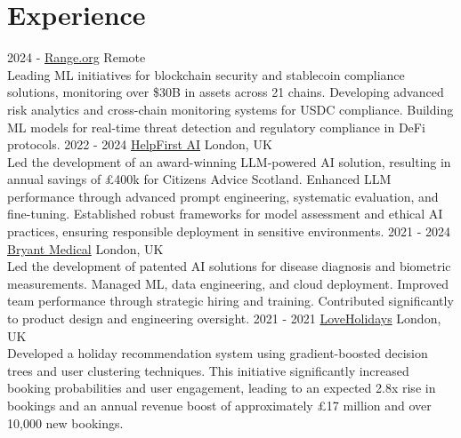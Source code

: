 \documentclass[print]{cv-style}          %
\begin{document}
\section{Experience}
\vspace{-0.2cm}
\begin{entrylist}
\entry
  {2024 - }
  {\href{https://range.org/}{Range.org}}
  {Remote}
  {
  \\
  Leading ML initiatives for blockchain security and stablecoin compliance solutions, monitoring over \$30B in assets across 21 chains. Developing advanced risk analytics and cross-chain monitoring systems for USDC compliance. Building ML models for real-time threat detection and regulatory compliance in DeFi protocols.
  }
\entry
  {2022 - 2024}
  {\href{https://www.helpfirst.ai/}{HelpFirst AI}}
  {London, UK}
  {
  \\
  Led the development of an award-winning LLM-powered AI solution, resulting in annual savings of £400k for Citizens Advice Scotland. Enhanced LLM performance through advanced prompt engineering, systematic evaluation, and fine-tuning. Established robust frameworks for model assessment and ethical AI practices, ensuring responsible deployment in sensitive environments.
  }
\entry
  {2021 - 2024}
  {\href{https://bryant.dental/}{Bryant Medical}}
  {London, UK}
  {
  \\
  Led the development of patented AI solutions for disease diagnosis and biometric measurements. Managed ML, data engineering, and cloud deployment. Improved team performance through strategic hiring and training. Contributed significantly to product design and engineering oversight.}
\entry
  {2021 - 2021}
  {\href{https://www.loveholidays.com/}{LoveHolidays}}
  {London, UK}
  {
  \\
  Developed a holiday recommendation system using gradient-boosted decision trees and user clustering techniques. This initiative significantly increased booking probabilities and user engagement, leading to an expected 2.8x rise in bookings and an annual revenue boost of approximately £17 million and over 10,000 new bookings.
  }
\vspace{-0.3cm} %

\end{entrylist}
\end{document}
